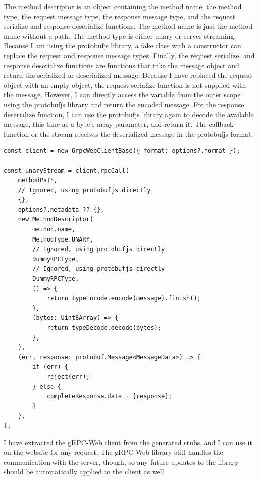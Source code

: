 The method descriptor is an object containing the method name, the method type, the request message type, the response message type, and the request serialize and response deserialize functions.
The method name is just the method name without a path.
The method type is either unary or server streaming.
Because I am using the protobufjs library, a fake class with a constructor can replace the request and response message types.
Finally, the request serialize, and response deserialize functions are functions that take the message object and return the serialized or deserialized message.
Because I have replaced the request object with an empty object, the request serialize function is not supplied with the message.
However, I can directly access the variable from the outer scope using the protobufjs library and return the encoded message.
For the response deserialize function, I can use the protobufjs library again to decode the available message, this time as a byte's array parameter, and return it.
The callback function or the stream receives the deserialized message in the protobufjs format.

\begin{lstlisting}[style=JavaScript, caption={gRPC-Web extracted client unary call example}, label={lst:grpc-web-client}]
const client = new GrpcWebClientBase({ format: options?.format });

const unaryStream = client.rpcCall(
    methodPath,
    // Ignored, using protobufjs directly
    {},
    options?.metadata ?? {},
    new MethodDescriptor(
        method.name,
        MethodType.UNARY,
        // Ignored, using protobufjs directly
        DummyRPCType,
        // Ignored, using protobufjs directly
        DummyRPCType,
        () => {
            return typeEncode.encode(message).finish();
        },
        (bytes: Uint8Array) => {
            return typeDecode.decode(bytes);
        },
    ),
    (err, response: protobuf.Message<MessageData>) => {
        if (err) {
            reject(err);
        } else {
            completeResponse.data = [response];
        }
    },
);
\end{lstlisting}


I have extracted the gRPC-Web client from the generated stubs, and I can use it on the website for any request.
The gRPC-Web library still handles the communication with the server, though, so any future updates to the library should be automatically applied to the client as well.

